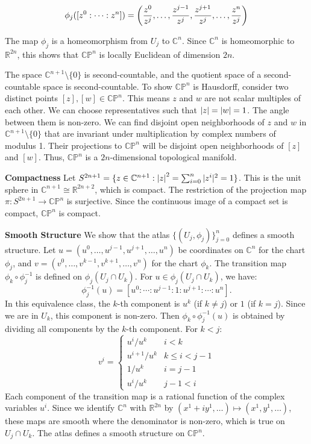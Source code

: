 \documentclass[12pt,letterpaper]{article}
\renewcommand \paragraph[1] {\medskip \noindent \textbf{#1}}
\begin{document}
\[
    \phi_j([z^0 : \cdots : z^n]) = \left(\frac{z^0}{z^j}, \ldots, \frac{z^{j-1}}{z^j}, \frac{z^{j+1}}{z^j}, \ldots, \frac{z^n}{z^j}\right)
\]

The map $\phi_j$ is a homeomorphism from $U_j$ to $\mathbb{C}^n$. Since $\mathbb{C}^n$ is homeomorphic to $\mathbb{R}^{2n}$, this shows that $\mathbb{CP}^n$ is locally Euclidean of dimension $2n$.

The space $\mathbb{C}^{n+1} \setminus \{0\}$ is second-countable, and the quotient space of a second-countable space is second-countable. To show $\mathbb{CP}^n$ is Hausdorff, consider two distinct points $[z], [w] \in \mathbb{CP}^n$. This means $z$ and $w$ are not scalar multiples of each other. We can choose representatives such that $\left|z\right| = \left|w\right| = 1$. The angle between them is non-zero. We can find disjoint open neighborhoods of $z$ and $w$ in $\mathbb{C}^{n+1} \setminus \{0\}$ that are invariant under multiplication by complex numbers of modulus 1. Their projections to $\mathbb{CP}^n$ will be disjoint open neighborhoods of $[z]$ and $[w]$. Thus, $\mathbb{CP}^n$ is a $2n$-dimensional topological manifold.

\paragraph{Compactness}
Let $S^{2n+1} = \{z \in \mathbb{C}^{n+1} : \left|z\right|^2 = \sum_{i=0}^n |z^i|^2 = 1\}$. This is the unit sphere in $\mathbb{C}^{n+1} \cong \mathbb{R}^{2n+2}$, which is compact. The restriction of the projection map $\pi: S^{2n+1} \to \mathbb{CP}^n$ is surjective. Since the continuous image of a compact set is compact, $\mathbb{CP}^n$ is compact.

\paragraph{Smooth Structure}
We show that the atlas $\{ (U_j, \phi_j) \}_{j=0}^n$ defines a smooth structure. Let $u = (u^0, \ldots, u^{j-1}, u^{j+1}, \ldots, u^n)$ be coordinates on $\mathbb{C}^n$ for the chart $\phi_j$, and $v = (v^0, \ldots, v^{k-1}, v^{k+1}, \ldots, v^n)$ for the chart $\phi_k$. The transition map $\phi_k \circ \phi_j^{-1}$ is defined on $\phi_j(U_j \cap U_k)$.
For $u \in \phi_j(U_j \cap U_k)$, we have:
\[ \phi_j^{-1}(u) = [u^0 : \cdots : u^{j-1} : 1 : u^{j+1} : \cdots : u^n]. \]
In this equivalence class, the $k$-th component is $u^k$ (if $k \neq j$) or $1$ (if $k=j$). Since we are in $U_k$, this component is non-zero.
Then $\phi_k \circ \phi_j^{-1}(u)$ is obtained by dividing all components by the $k$-th component. For $k < j$:
\[ v^i = \begin{cases} u^i/u^k & i < k \\ u^{i+1}/u^k & k \le i < j-1 \\ 1/u^k & i = j-1 \\ u^{i}/u^k & j-1 < i \end{cases} \]
Each component of the transition map is a rational function of the complex variables $u^i$. Since we identify $\mathbb{C}^n$ with $\mathbb{R}^{2n}$ by $(x^1+iy^1, \ldots) \mapsto (x^1, y^1, \ldots)$, these maps are smooth where the denominator is non-zero, which is true on $U_j \cap U_k$. The atlas defines a smooth structure on $\mathbb{CP}^n$.
\end{document}
